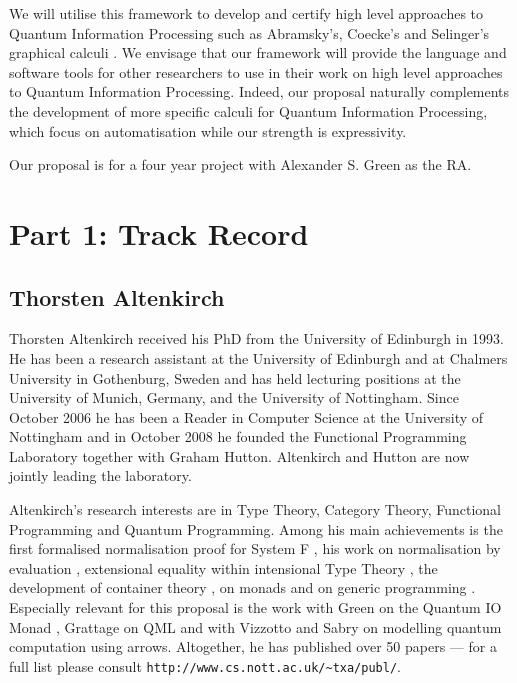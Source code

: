 \documentclass[a4paper]{article}
\begin{document}
We will utilise this framework to develop and certify high level
approaches to Quantum Information Processing such as Abramsky's,
Coecke's and Selinger's graphical calculi . 
We envisage
that our framework will provide the language and software tools for
other researchers to use in their work on high level approaches to
Quantum Information Processing. Indeed, our proposal naturally
complements the development of more specific calculi for Quantum
Information Processing, which focus on automatisation while our
strength is expressivity.%

Our proposal is for a four year project with Alexander S. Green as the
RA.

\section*{Part 1: Track Record}


\subsection*{Thorsten Altenkirch}
Thorsten Altenkirch received his PhD from the University of
Edinburgh in 1993. He has been a research assistant at the University of
Edinburgh and at Chalmers University in Gothenburg, Sweden and has
held lecturing positions at the University of Munich, Germany, and the
University of Nottingham. Since October 2006 he has been a Reader in
Computer Science at the University of Nottingham and in October
2008 he founded the Functional Programming Laboratory together with
Graham Hutton. Altenkirch and Hutton are now jointly leading the
laboratory.

Altenkirch's research interests are in Type Theory, Category Theory, Functional
Programming and Quantum Programming. 
Among his main achievements is
the first formalised normalisation proof for System F
, his work on normalisation by evaluation 
, extensional equality within intensional Type Theory 
, the development of container theory %
, on
monads  
and on generic programming 
.
Especially relevant for this proposal is the
work with Green on the Quantum IO Monad 
, Grattage on QML  and with Vizzotto and Sabry on
modelling quantum computation  using
arrows. Altogether, he has published over 50 papers --- for a full list please
consult \texttt{http://www.cs.nott.ac.uk/\~{}txa/publ/}.
\end{document}
